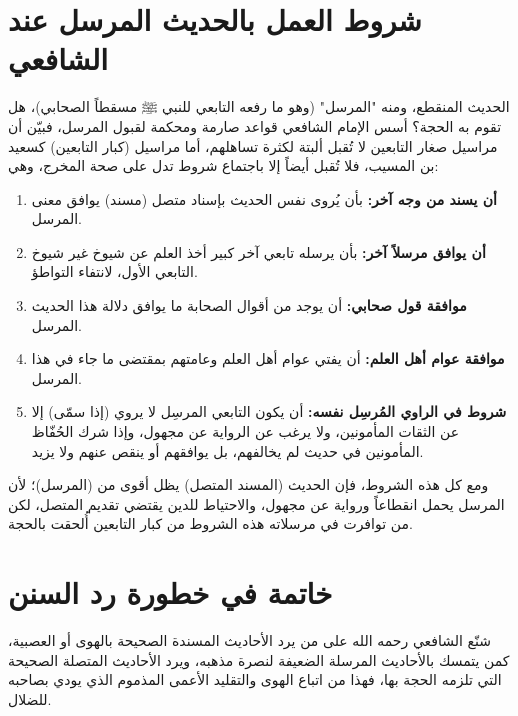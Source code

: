 \section{شروط العمل بالحديث المرسل عند الشافعي}
الحديث المنقطع، ومنه "المرسل" (وهو ما رفعه التابعي للنبي ﷺ مسقطاً الصحابي)، هل تقوم به الحجة؟ 
أسس الإمام الشافعي قواعد صارمة ومحكمة لقبول المرسل، فبيّن أن مراسيل صغار التابعين لا تُقبل ألبتة لكثرة تساهلهم، أما مراسيل (كبار التابعين) كسعيد بن المسيب، فلا تُقبل أيضاً إلا باجتماع شروط تدل على صحة المخرج، وهي:
\begin{enumerate}
    \item \textbf{أن يسند من وجه آخر:} بأن يُروى نفس الحديث بإسناد متصل (مسند) يوافق معنى المرسل.
    \item \textbf{أن يوافق مرسلاً آخر:} بأن يرسله تابعي آخر كبير أخذ العلم عن شيوخ غير شيوخ التابعي الأول، لانتفاء التواطؤ.
    \item \textbf{موافقة قول صحابي:} أن يوجد من أقوال الصحابة ما يوافق دلالة هذا الحديث المرسل.
    \item \textbf{موافقة عوام أهل العلم:} أن يفتي عوام أهل العلم وعامتهم بمقتضى ما جاء في هذا المرسل.
    \item \textbf{شروط في الراوي المُرسِل نفسه:} أن يكون التابعي المرسِل لا يروي (إذا سمّى) إلا عن الثقات المأمونين، ولا يرغب عن الرواية عن مجهول، وإذا شرك الحُفّاظ المأمونين في حديث لم يخالفهم، بل يوافقهم أو ينقص عنهم ولا يزيد.
\end{enumerate}
ومع كل هذه الشروط، فإن الحديث (المسند المتصل) يظل أقوى من (المرسل)؛ لأن المرسل يحمل انقطاعاً ورواية عن مجهول، والاحتياط للدين يقتضي تقديم المتصل، لكن من توافرت في مرسلاته هذه الشروط من كبار التابعين أُلحقت بالحجة.

\section{خاتمة في خطورة رد السنن}
شنّع الشافعي رحمه الله على من يرد الأحاديث المسندة الصحيحة بالهوى أو العصبية، كمن يتمسك بالأحاديث المرسلة الضعيفة لنصرة مذهبه، ويرد الأحاديث المتصلة الصحيحة التي تلزمه الحجة بها، فهذا من اتباع الهوى والتقليد الأعمى المذموم الذي يودي بصاحبه للضلال.